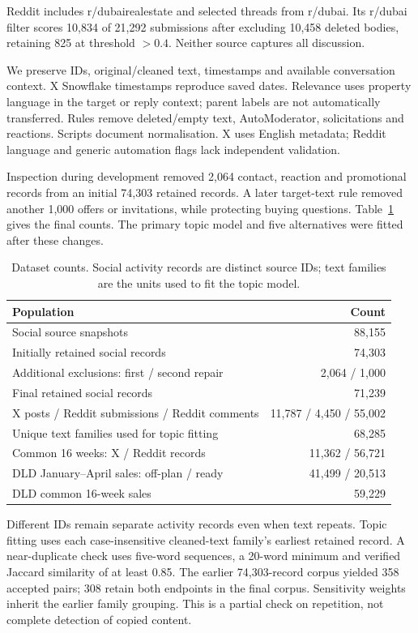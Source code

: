 \documentclass[graybox]{svmult}
\begin{document}
Reddit includes r/dubairealestate and selected threads from r/dubai. Its r/dubai filter scores 10,834 of 21,292 submissions after excluding 10,458 deleted bodies, retaining 825 at threshold $>0.4$. Neither source captures all discussion.

We preserve IDs, original/cleaned text, timestamps and available conversation context. X Snowflake timestamps reproduce saved dates. Relevance uses property language in the target or reply context; parent labels are not automatically transferred. Rules remove deleted/empty text, AutoModerator, solicitations and reactions. Scripts document normalisation. X uses English metadata; Reddit language and generic automation flags lack independent validation.

Inspection during development removed 2,064 contact, reaction and promotional records from an initial 74,303 retained records. A later target-text rule removed another 1,000 offers or invitations, while protecting buying questions. Table~\ref{tab:flow} gives the final counts. The primary topic model and five alternatives were fitted after these changes.

\begin{table}[t]
\caption{Dataset counts. Social activity records are distinct source IDs; text families are the units used to fit the topic model.}\label{tab:flow}
\centering\small
\begin{tabular}{lr}\toprule
Population & Count\\\midrule
Social source snapshots & 88,155\\
Initially retained social records & 74,303\\
Additional exclusions: first / second repair & 2,064 / 1,000\\
Final retained social records & 71,239\\
\quad X posts / Reddit submissions / Reddit comments & 11,787 / 4,450 / 55,002\\
Unique text families used for topic fitting & 68,285\\
Common 16 weeks: X / Reddit records & 11,362 / 56,721\\
DLD January--April sales: off-plan / ready & 41,499 / 20,513\\
DLD common 16-week sales & 59,229\\\bottomrule
\end{tabular}
\end{table}

Different IDs remain separate activity records even when text repeats. Topic fitting uses each case-insensitive cleaned-text family's earliest retained record. A near-duplicate check uses five-word sequences, a 20-word minimum and verified Jaccard similarity of at least 0.85. The earlier 74,303-record corpus yielded 358 accepted pairs; 308 retain both endpoints in the final corpus. Sensitivity weights inherit the earlier family grouping. This is a partial check on repetition, not complete detection of copied content.
\end{document}
